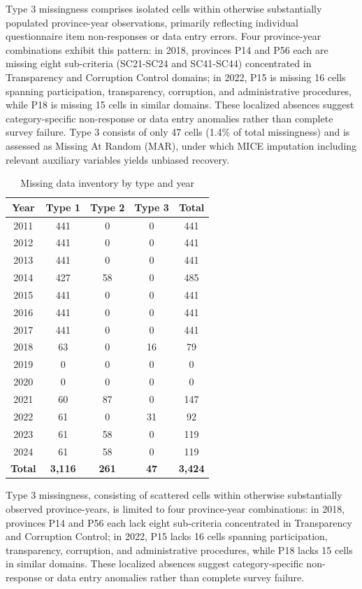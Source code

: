 \documentclass[12pt,a4paper]{article}
\begin{document}
Type 3 missingness comprises isolated cells within otherwise substantially populated province-year observations, primarily reflecting individual questionnaire item non-responses or data entry errors. Four province-year combinations exhibit this pattern: in 2018, provinces P14 and P56 each are missing eight sub-criteria (SC21\--SC24 and SC41\--SC44) concentrated in Transparency and Corruption Control domains; in 2022, P15 is missing 16 cells spanning participation, transparency, corruption, and administrative procedures, while P18 is missing 15 cells in similar domains. These localized absences suggest category-specific non-response or data entry anomalies rather than complete survey failure. Type 3 consists of only 47 cells (1.4\% of total missingness) and is assessed as Missing At Random (MAR), under which MICE imputation including relevant auxiliary variables yields unbiased recovery.

\begin{table}[!ht]
\centering
\caption{Missing data inventory by type and year}
\label{tab:missing_by_type}
\small
\begin{tabular}{c c c c c}
\toprule
\textbf{Year} & \textbf{Type 1} & \textbf{Type 2} & \textbf{Type 3} & \textbf{Total} \\
\midrule
2011 & 441 & 0 & 0 & 441 \\
2012 & 441 & 0 & 0 & 441 \\
2013 & 441 & 0 & 0 & 441 \\
2014 & 427 & 58 & 0 & 485 \\
2015 & 441 & 0 & 0 & 441 \\
2016 & 441 & 0 & 0 & 441 \\
2017 & 441 & 0 & 0 & 441 \\
2018 & 63 & 0 & 16 & 79 \\
2019 & 0 & 0 & 0 & 0 \\
2020 & 0 & 0 & 0 & 0 \\
2021 & 60 & 87 & 0 & 147 \\
2022 & 61 & 0 & 31 & 92 \\
2023 & 61 & 58 & 0 & 119 \\
2024 & 61 & 58 & 0 & 119 \\
\midrule
\textbf{Total} & \textbf{3,116} & \textbf{261} & \textbf{47} & \textbf{3,424} \\
\bottomrule
\end{tabular}
\end{table}

\FloatBarrier

Type 3 missingness, consisting of scattered cells within otherwise substantially observed province-years, is limited to four province-year combinations: in 2018, provinces P14 and P56 each lack eight sub-criteria concentrated in Transparency and Corruption Control; in 2022, P15 lacks 16 cells spanning participation, transparency, corruption, and administrative procedures, while P18 lacks 15 cells in similar domains. These localized absences suggest category-specific non-response or data entry anomalies rather than complete survey failure.
\end{document}
